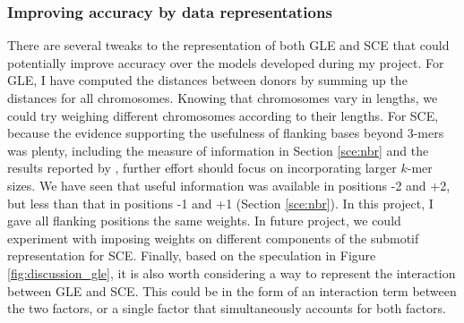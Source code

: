 \subsubsection{Improving accuracy by data representations}
There are several tweaks to the representation of both GLE and SCE that could potentially improve accuracy over the models developed during my project. For GLE, I have computed the distances between donors by summing up the distances for all chromosomes. Knowing that chromosomes vary in lengths, we could try weighing different chromosomes according to their lengths. For SCE, because the evidence supporting the usefulness of flanking bases beyond 3-mers was plenty, including the measure of information in Section \ref{sce:nbr} and the results reported by \citet{Zhang2020}, further effort should focus on incorporating larger $k$-mer sizes. We have seen that useful information was available in positions -2 and +2, but less than that in positions -1 and +1 (Section \ref{sce:nbr}). In this project, I gave all flanking positions the same weights. In future project, we could experiment with imposing weights on different components of the submotif representation for SCE. Finally, based on the speculation in Figure \ref{fig:discussion_gle}, it is also worth considering a way to represent the interaction between GLE and SCE. This could be in the form of an interaction term between the two factors, or a single factor that simultaneously accounts for both factors.


